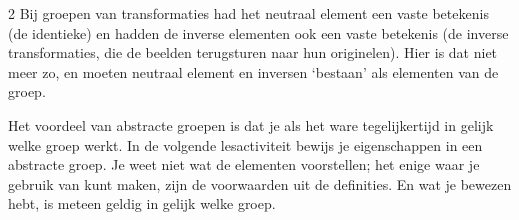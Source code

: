 \begin{multicols}{2}
	Bij groepen van transformaties had het neutraal element een vaste betekenis (de identieke) en hadden de inverse elementen ook een vaste betekenis (de inverse transformaties, die de beelden terugsturen naar hun originelen). Hier is dat niet meer zo, en moeten neutraal element en inversen `bestaan' als elementen van de groep.
	
	Het voordeel van abstracte groepen is dat je als het ware tegelijkertijd in gelijk welke groep werkt. In de volgende lesactiviteit bewijs je eigenschappen in een abstracte groep. Je weet niet wat de elementen voorstellen; het enige waar je gebruik van kunt maken, zijn de voorwaarden uit de definities. En wat je bewezen hebt, is meteen geldig in gelijk welke groep.
	
\end{multicols}
	
